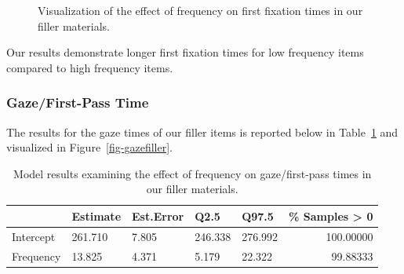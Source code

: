 \documentclass[
  letterpaper,
  DIV=11,
  numbers=noendperiod,
  nottoc]{scrreprt}
\begin{document}
\begin{figure}[htbp]


\caption{\label{fig-firstfixationfiller}Visualization of the effect of
frequency on first fixation times in our filler materials.}

\end{figure}%

Our results demonstrate longer first fixation times for low frequency
items compared to high frequency items.

\subsubsection{Gaze/First-Pass Time}\label{gazefirst-pass-time-1}

The results for the gaze times of our filler items is reported below in
Table~\ref{tbl-gazefiller} and visualized in
Figure~\ref{fig-gazefiller}.

\begin{longtable}[]{@{}lllllr@{}}

\caption{\label{tbl-gazefiller}Model results examining the effect of
frequency on gaze/first-pass times in our filler materials.}

\tabularnewline

\toprule\noalign{}
& Estimate & Est.Error & Q2.5 & Q97.5 & \% Samples \textgreater{} 0 \\
\midrule\noalign{}
\endhead
\bottomrule\noalign{}
\endlastfoot
Intercept & 261.710 & 7.805 & 246.338 & 276.992 & 100.00000 \\
Frequency & 13.825 & 4.371 & 5.179 & 22.322 & 99.88333 \\

\end{longtable}
\end{document}
